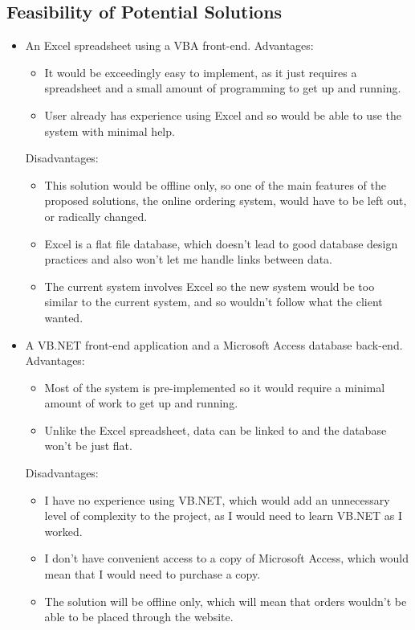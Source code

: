\documentclass[
11pt, %
a4paper, %
oneside, %
headinclude,footinclude, %
BCOR5mm, %
]{scrartcl}
\begin{document}
\subsection{Feasibility of Potential Solutions}
\begin{itemize}
	\item An Excel spreadsheet using a VBA front-end. Advantages:\begin{itemize}
		\item It would be exceedingly easy to implement, as it just requires a spreadsheet and a small amount of programming to get up and running.
		\item User already has experience using Excel and so would be able to use the system with minimal help.
	\end{itemize}
	Disadvantages:\begin{itemize}
		\item This solution would be offline only, so one of the main features of the proposed solutions, the online ordering system, would have to be left out, or radically changed.
		\item Excel is a flat file database, which doesn't lead to good database design practices and also won't let me handle links between data.
		\item The current system involves Excel so the new system would be too similar to the current system, and so wouldn't follow what the client wanted. 
	\end{itemize}
	\item A VB.NET front-end application and a Microsoft Access database back-end. Advantages:\begin{itemize}
		\item Most of the system is pre-implemented so it would require a minimal amount of work to get up and running.
		\item Unlike the Excel spreadsheet, data can be linked to and the database won't be just flat.
	\end{itemize}
	Disadvantages:\begin{itemize}
		\item I have no experience using VB.NET, which would add an unnecessary level of complexity to the project, as I would need to learn VB.NET as I worked.
		\item I don't have convenient access to a copy of Microsoft Access, which would mean that I would need to purchase a copy.
		\item The solution will be offline only, which will mean that orders wouldn't be able to be placed through the website.

\end{itemize}
\end{itemize}
\end{document}
